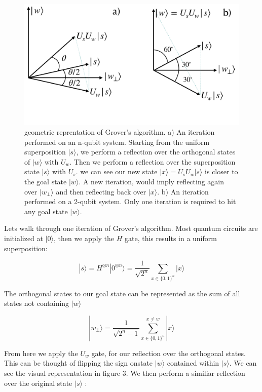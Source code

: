 \documentclass[twocolumn,showpacs,preprintnumbers,amsmath,amssymb]{revtex4}
\begin{document}
		
		\begin{figure}[!h]
			\centering
			\includegraphics[trim={0 7.5cm 0 0},clip, width=0.99\linewidth]{"graphics/grov_geom"}
			\caption{geometric reprentation of Grover's algorithm.  a) An iteration performed on an n-qubit system.  Starting from the uniform superposition $|s\rangle$, we perform a reflection over the orthogonal states of $|w\rangle$ with $U_w$. Then we perform a reflection over the superposition state $|s\rangle$ with $U_s$. we can see our new state $|x\rangle = U_sU_w|s\rangle$ is closer to the goal state $|w\rangle$. A new iteration, would imply reflecting again over $|w_\perp\rangle$ and then reflecting back over $|x\rangle$. b) An iteration performed on a 2-qubit system. Only one iteration is required to hit any goal state $|w\rangle$. }
			\label{fig:grovergeometric}
		\end{figure}
		
		Lets walk through one iteration of Grover's algorithm. Most quantum circuits are initialized at $|0\rangle$, then we apply the $H$ gate, this results in a uniform superposition:
		
		\begin{equation}
		 |s\rangle = H^{\otimes n} |0^{\otimes n} \rangle = \frac{1}{\sqrt{2^n}} \sum_{x\in\{0,1\}^n} |x\rangle
		\end{equation}
		
		The orthogonal states to our goal state can be represented as the sum of all states not containing $|w\rangle$
		
		$$ |w_\perp\rangle=  \frac{1}{\sqrt{2^n -1}} \sum_{x\in\{0,1\}^n}^{x \neq w} |x\rangle$$
		
		From here we apply the $U_w$ gate, for our reflection over the orthogonal states. This can be thought of flipping the sign onstate $|w\rangle$ contained within $|s\rangle$. We can see the visual representation in figure 3. We then perform a similiar reflection over the original state $|s\rangle$ :
		
\end{document}

